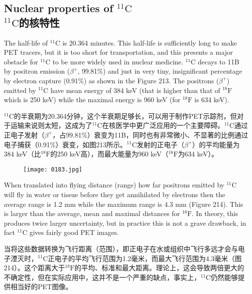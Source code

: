 \documentclass[dvipsnames, svgnames,a4paper,11pt]{article}
\begin{document}
\subsection{Nuclear properties of ${}^\mathrm{11}\mathrm{C}$ \\${}^\mathrm{11}\mathrm{C}$的核特性}
The half-life of ${}^\mathrm{11}\mathrm{C}$ is 20.364 minutes. This half-life is sufficiently long to make PET
tracers, but it is too short for transportation, and this presents a major obstacle for
${}^\mathrm{11}\mathrm{C}$ to be more widely used in nuclear medicine. ${}^\mathrm{11}\mathrm{C}$ decays to 11B by positron
emission ($\beta^+$, 99.81\%) and just in very tiny, insignificant percentage by electron
capture (0.91\%) as shown in the Figure 213. The positrons ($\beta^+$) emitted by ${}^\mathrm{11}\mathrm{C}$ have
mean energy of 384 keV (that is higher than that of ${}^\mathrm{18}\mathrm{F}$ which is 250 keV) while the
maximal energy is 960 keV (for ${}^\mathrm{18}\mathrm{F}$ is 634 keV). 

${}^\mathrm{11}\mathrm{C}$的半衰期为20.364分钟，这个半衰期足够长，可以用于制作PET示踪剂，但对于运输来说则太短，这成为了${}^\mathrm{11}\mathrm{C}$在核医学中更广泛应用的一个主要障碍。${}^\mathrm{11}\mathrm{C}$通过正电子发射（$\beta^+$，占99.81\%）衰变为11B，同时也有非常微小、不显著的比例通过电子捕获（0.91\%）衰变，如图213所示。${}^\mathrm{11}\mathrm{C}$发射的正电子（$\beta^+$）的平均能量为384 keV（比${}^\mathrm{18}\mathrm{F}$的250 keV高），而最大能量为960 keV（${}^\mathrm{18}\mathrm{F}$为634 keV）。

\begin{figure}[h]
	\centering
    \texttt{[image: 0183.jpg]}  
     \label{fig213}
\end{figure}



When translated into flying distance (range) how far positrons emitted by ${}^\mathrm{11}\mathrm{C}$ will fly
in water or tissue before they get annihilated by electrons then the average range is
1.2 mm while the maximum range is 4.3 mm (Figure 214). This is larger than the
average, mean and maximal distances for ${}^\mathrm{18}\mathrm{F}$. In theory, this produces twice larger
uncertainty, but in practice this is not a grave drawback, in fact ${}^\mathrm{11}\mathrm{C}$ gives fairly good
PET images.

当将这些数据转换为飞行距离（范围），即正电子在水或组织中飞行多远才会与电子湮灭时，${}^\mathrm{11}\mathrm{C}$正电子的平均飞行范围为1.2毫米，而最大飞行范围为4.3毫米（图214）。这个距离大于${}^\mathrm{18}\mathrm{F}$的平均、标准和最大距离。理论上，这会导致两倍更大的不确定性，但在实际应用中，这并不是一个严重的缺点，事实上，${}^\mathrm{11}\mathrm{C}$仍然能够提供相当好的PET图像。
\end{document}
